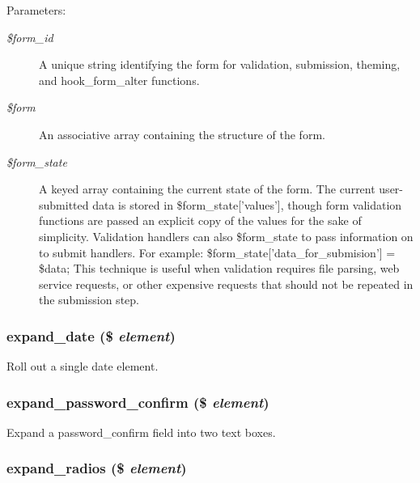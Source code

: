 \begin{Desc}
\item[Parameters:]
\begin{description}
\item[{\em \$form\_\-id}]A unique string identifying the form for validation, submission, theming, and hook\_\-form\_\-alter functions. \item[{\em \$form}]An associative array containing the structure of the form. \item[{\em \$form\_\-state}]A keyed array containing the current state of the form. The current user-submitted data is stored in \$form\_\-state\mbox{[}'values'\mbox{]}, though form validation functions are passed an explicit copy of the values for the sake of simplicity. Validation handlers can also \$form\_\-state to pass information on to submit handlers. For example: \$form\_\-state\mbox{[}'data\_\-for\_\-submision'\mbox{]} = \$data; This technique is useful when validation requires file parsing, web service requests, or other expensive requests that should not be repeated in the submission step. \end{description}
\end{Desc}
\hypertarget{group__form__api_ga0f7a426d54cdfcd03bf0e8f9ecbd36a}{
\subsubsection[{expand\_\-date}]{\setlength{\rightskip}{0pt plus 5cm}expand\_\-date (\$ {\em element})}}
\label{group__form__api_ga0f7a426d54cdfcd03bf0e8f9ecbd36a}


Roll out a single date element. \hypertarget{group__form__api_gec5db42527669f2e0a0ea5f0a4d52bfa}{
\subsubsection[{expand\_\-password\_\-confirm}]{\setlength{\rightskip}{0pt plus 5cm}expand\_\-password\_\-confirm (\$ {\em element})}}
\label{group__form__api_gec5db42527669f2e0a0ea5f0a4d52bfa}


Expand a password\_\-confirm field into two text boxes. \hypertarget{group__form__api_gf7c1d7c703a78e2f7d91e0ab0a11674d}{
\subsubsection[{expand\_\-radios}]{\setlength{\rightskip}{0pt plus 5cm}expand\_\-radios (\$ {\em element})}}
\label{group__form__api_gf7c1d7c703a78e2f7d91e0ab0a11674d}



